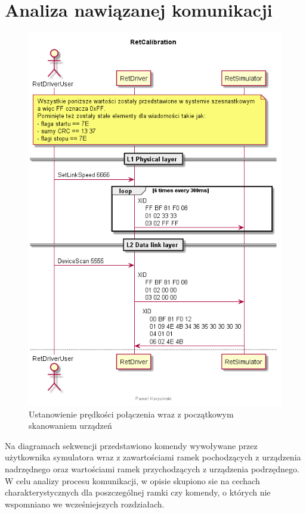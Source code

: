 \chapter{Analiza nawiązanej komunikacji}
    \begin{figure}[h!]
    \centering
    \includegraphics[scale=0.70]{out/Diagramy/UML_DiagramOfSequence_New/RetCalibration-page1.png}
    \caption{Ustanowienie prędkości połączenia wraz z początkowym skanowaniem urządzeń}
    \end{figure}
    \newpage

    Na diagramach sekwencji przedstawiono komendy wywoływane przez użytkownika
    symulatora wraz z zawartościami ramek pochodzących z urządzenia nadrzędnego oraz
    wartościami ramek przychodzących z urządzenia podrzędnego.
    W celu analizy procesu komunikacji, w opisie skupiono sie na cechach charakterystycznych
    dla poszczególnej ramki czy komendy, o których nie wspomniano we wcześniejszych rozdziałach.
    
